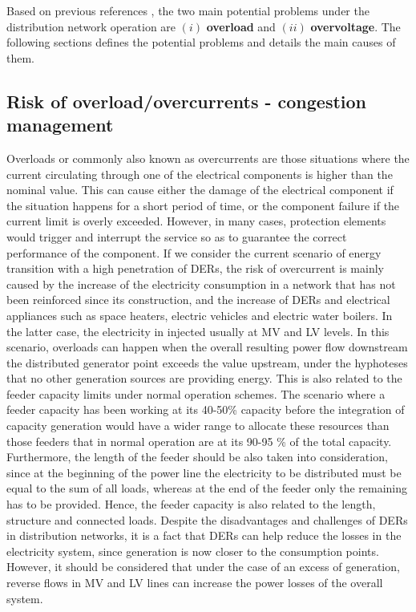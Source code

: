 Based on previous references \cite{ISMAEL20191002, Bollen2011}, the two main potential problems under the distribution network operation are $(i)$ \textbf{overload} and  $(ii)$ \textbf{overvoltage}. The following sections defines the potential problems and details the main causes of them. 


\subsection{Risk of overload/overcurrents - congestion management}
Overloads or commonly also known as overcurrents are those situations where the current circulating through one of the electrical components is higher than the nominal value. This can cause either the damage of the electrical component if the situation happens for a short period of time, or the component failure if the current limit is overly exceeded. However, in many cases, protection elements would trigger and interrupt the service so as to guarantee the correct performance of the component. 
If we consider the current scenario of energy transition with a high penetration of DERs, the risk of overcurrent is mainly caused by the increase of the electricity consumption in a network that has not been reinforced since its construction, and the increase of DERs and electrical appliances such as space heaters, electric vehicles and electric water boilers. In the latter case, the electricity in injected usually at MV and LV levels. In this scenario, overloads can happen when the overall resulting power flow downstream the distributed generator point exceeds the value upstream, under the hyphoteses that no other generation sources are providing energy. This is also related to the feeder capacity limits under normal operation schemes. The scenario where a feeder capacity has been working at its 40-50\% capacity before the integration of capacity generation would have a wider range to allocate these resources than those feeders that in normal operation are at its 90-95 \% of the total capacity. Furthermore, the length of the feeder should be also taken into consideration, since at the beginning of the power line the electricity to be distributed must be equal to the sum of all loads, whereas at the end of the feeder only the remaining has to be provided. Hence, the feeder capacity is also related to the length, structure and connected loads. 
Despite the disadvantages and challenges of DERs in distribution networks, it is a fact that DERs can help reduce the losses in the electricity system, since generation is now closer to the consumption points. However, it should be considered that under the case of an excess of generation, reverse flows in MV and LV lines can increase the power losses of the overall system. 

